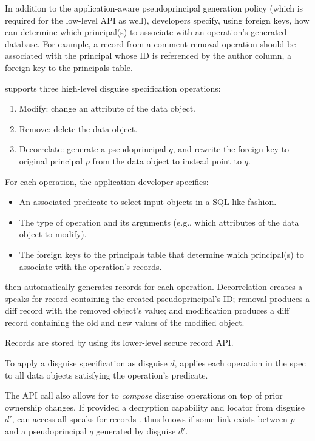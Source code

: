 In addition to the application-aware pseudoprincipal generation policy (which is required for the
low-level API as well), developers specify, using foreign keys, how \sys can determine which
principal(s) to associate with an operation's generated database. For example, a record from a
comment removal operation should be associated with the principal whose ID is referenced by the
author column, a foreign key to the principals table.

\vspace{6pt}\noindent
\sys supports three high-level disguise specification operations:
\begin{enumerate}
    \item Modify: change an attribute of the data object.
    \item Remove: delete the data object.
    \item Decorrelate: generate a pseudoprincipal $q$, and rewrite the foreign key to original
        principal $p$ from the data object to instead point to $q$.  
\end{enumerate}

\noindent For each operation, the application developer specifies:
\begin{itemize}
    \item An associated predicate to select input objects in a SQL-like fashion.
    \item The type of operation and its arguments (e.g., which attributes of the data object to
        modify).
    \item The foreign keys to the principals table that determine which principal(s) to associate
        with the operation's records.
\end{itemize}
%
\sys then automatically generates records for each operation.
Decorrelation creates a speaks-for record  containing the created pseudoprincipal's
ID; removal produces a diff record  with the removed object's value; and modification
produces a diff record  containing the old and new values of the modified object.

Records are stored by \sys using its lower-level secure record API.

To apply a disguise specification as disguise $d$, \sys applies each operation in the spec to
all data objects satisfying the operation's predicate. 

The  API call also allows for \sys to \emph{compose} disguise operations on top of
prior ownership changes.
If provided a decryption capability and locator  from disguise $d'$, \sys can access all
speaks-for records
. \sys thus knows if some link exists between $p$ and a pseudoprincipal $q$ generated by
disguise $d'$.

